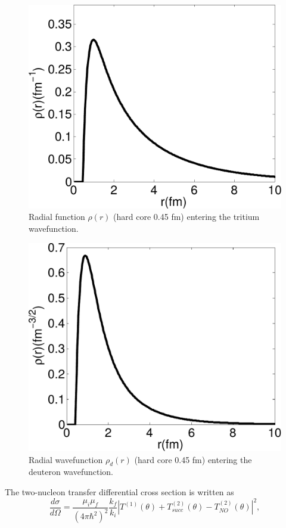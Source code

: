\begin{figure}
\centerline{\includegraphics*[width=.55\textwidth,angle=0]{C7/figs_C7/tritium.pdf}}
\caption{Radial function $\rho(r)$ (hard core 0.45 fm) entering the tritium wavefunction.}\label{fig7_1_1}
\end{figure}
\begin{figure}
\centerline{\includegraphics*[width=.55\textwidth,angle=0]{C7/figs_C7/deuteron.pdf}}
\caption{Radial wavefunction $\rho_d(r)$ (hard core 0.45 fm) entering the deuteron wavefunction.}\label{fig7_1_2}
\end{figure}
The two-nucleon transfer differential cross section is written as
\begin{equation}\label{eq5.1.4}
\frac{d\sigma}{d\Omega}=\frac{\mu_i\mu_f}{(4\pi\hbar^2)^2}\frac{k_f}{k_i}\left|T^{(1)}(\theta)+T^{(2)}_{succ}(\theta)-T^{(2)}_{NO}(\theta)\right|^2,
\end{equation}

